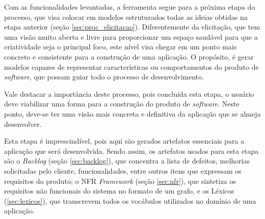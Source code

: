\label{sec:modelagem_proposta}

Com as funcionalidades levantadas, a ferramenta segue para a próxima etapa do processo, que visa colocar em modelos estruturados todas as ideias obtidas na etapa anterior (seção \ref{sec:proc_elicitacao}). Diferentemente da elicitação, que tem uma visão muito aberta e livre para proporcionar um espaço saudável para que a criatividade seja o principal foco, este nível visa chegar em um ponto mais concreto e consistente para a construção de uma aplicação. O propósito, é gerar modelos capazes de representar características ou comportamentos do produto de \textit{software}, que possam guiar todo o processo de desenvolvimento.

Vale destacar a importância deste processo, pois concluída esta etapa, o usuário deve viabilizar uma forma para a construção do produto de \textit{software}. Neste ponto, deve-se ter uma visão mais concreta e definitiva da aplicação que se almeja desenvolver.

Esta etapa é imprescindível, pois aqui são gerados artefatos essenciais para a aplicação que será desenvolvida. Sendo assim, os artefatos usados para esta etapa são o \textit{Backlog} (seção \ref{sec:backlog}), que concentra a lista de defeitos, melhorias solicitadas pelo cliente, funcionalidades, entre outros itens que expressam os requisitos do produto; o NFR \textit{Framework} (seção \ref{sec:nfr}), que sintetiza os requisitos não funcionais do sistema no formato de um grafo, e os Léxicos (\ref{sec:lexicos}), que transcrevem todos os vocábulos utilizados no domínio de uma aplicação.



